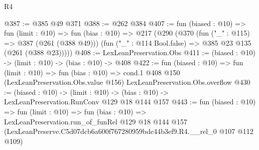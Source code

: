 \begin{lexlean}{R4}
\begin{coremodule}
@387 := @385 @49 @371
@388 := @262 @384
@407 := fun (biased : @10) =>
  fun (limit : @10) =>
  fun (bias : @10) =>
  @217
    (@290
      (@370
        (fun ("_" : @115) => @387 (@261 (@388 @49)))
        (fun ("_" : @114 Bool.false) => @385 @23 @135 (@261 (@388 @23)))))
@408 := LexLeanPreservation.Obs
@411 := (biased : @10) -> (limit : @10) -> (bias : @10) -> @408
@422 := fun (biased : @10) =>
  fun (limit : @10) =>
  fun (bias : @10) =>
  cond.{1} @408 @150 (LexLeanPreservation.Obs.value @156) LexLeanPreservation.Obs.overflow
@430 := (biased : @10) ->
  (limit : @10) -> (bias : @10) -> LexLeanPreservation.RunConv @129 @18 @144 @157
@443 := fun (biased : @10) =>
  fun (limit : @10) =>
  fun (bias : @10) =>
  LexLeanPreservation.run_of_funRel
    @129
    @18
    @144
    @157
    (LexLeanPreserve.C5d07dcb6a600f767280959bdc44b3ef9.R4.__rel_0 @107 @112 @109)
\end{coremodule}
\end{lexlean}
